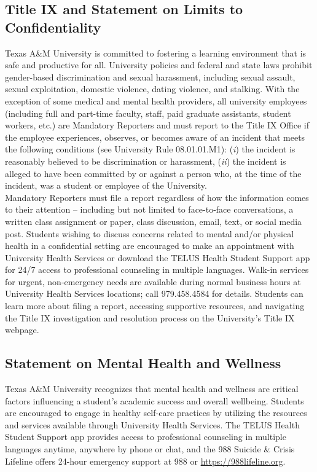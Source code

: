 \documentclass[11pt]{article}
\begin{document}
\subsection*{Title IX and Statement on Limits to Confidentiality}
Texas A\&M University is committed to fostering a learning environment that is safe and productive for all. University policies and federal and state laws prohibit gender-based discrimination and sexual harassment, including sexual assault, sexual exploitation, domestic violence, dating violence, and stalking.
With the exception of some medical and mental health providers, all university employees (including full and part-time faculty, staff, paid graduate assistants, student workers, etc.) are Mandatory Reporters and must report to the Title IX Office if the employee experiences, observes, or becomes aware of an incident that meets the following conditions (see University Rule 08.01.01.M1):
(\emph{i}) the incident is reasonably believed to be discrimination or harassment,
(\emph{ii}) the incident is alleged to have been committed by or against a person who, at the time of the incident, was a student or employee of the University.
\\[.5ex]
Mandatory Reporters must file a report regardless of how the information comes to their attention – including but not limited to face-to-face conversations, a written class assignment or paper, class discussion, email, text, or social media post.
Students wishing to discuss concerns related to mental and/or physical health in a confidential setting are encouraged to make an appointment with University Health Services or download the TELUS Health Student Support app for 24/7 access to professional counseling in multiple languages. Walk-in services for urgent, non-emergency needs are available during normal business hours at University Health Services locations; call 979.458.4584 for details.
Students can learn more about filing a report, accessing supportive resources, and navigating the Title IX investigation and resolution process on the University’s Title IX webpage.

\subsection*{Statement on Mental Health and Wellness}
Texas A\&M University recognizes that mental health and wellness are critical factors influencing a student’s academic success and overall wellbeing. Students are encouraged to engage in healthy self-care practices by utilizing the resources and services available through University Health Services. The TELUS Health Student Support app provides access to professional counseling in multiple languages anytime, anywhere by phone or chat, and the 988 Suicide \& Crisis Lifeline offers 24-hour emergency support at 988 or \url{https://988lifeline.org}.
\end{document}
